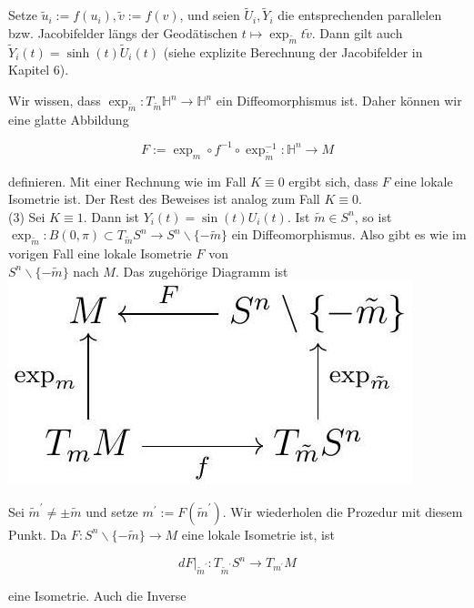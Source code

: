 \documentclass[10pt, letterpaper]{article}
\begin{document}
Setze $\tilde{u}_{i}:=f\left(u_{i}\right), \tilde{v}:=f(v)$, und seien $\tilde{U}_{i}, \tilde{Y}_{i}$ die entsprechenden parallelen bzw. Jacobifelder längs der Geodätischen $t \mapsto \exp _{\tilde{m}} t \tilde{v}$. Dann gilt auch $\tilde{Y}_{i}(t)=\sinh (t) \tilde{U}_{i}(t)$ (siehe explizite Berechnung der Jacobifelder in Kapitel 6).

Wir wissen, dass $\exp _{\tilde{m}}: T_{\tilde{m}} \mathbb{H}^{n} \rightarrow \mathbb{H}^{n}$ ein Diffeomorphismus ist. Daher können wir eine glatte Abbildung

$$
F:=\exp _{m} \circ f^{-1} \circ \exp _{\tilde{m}}^{-1}: \mathbb{H}^{n} \rightarrow M
$$

definieren. Mit einer Rechnung wie im Fall $K \equiv 0$ ergibt sich, dass $F$ eine lokale Isometrie ist. Der Rest des Beweises ist analog zum Fall $K \equiv 0$.\\
(3) Sei $K \equiv 1$. Dann ist $Y_{i}(t)=\sin (t) U_{i}(t)$. Ist $\tilde{m} \in S^{n}$, so ist $\exp _{\tilde{m}}: B(0, \pi) \subset T_{\tilde{m}} S^{n} \rightarrow S^{n} \backslash\{-\tilde{m}\}$ ein Diffeomorphismus. Also gibt es wie im vorigen Fall eine lokale Isometrie $F$ von\\
$S^{n} \backslash\{-\tilde{m}\}$ nach $M$. Das zugehörige Diagramm ist\\
\includegraphics[max width=\textwidth, center]{2025_05_20_3825c151ba0898b77b6eg-086}

Sei $\tilde{m}^{\prime} \neq \pm \tilde{m}$ und setze $m^{\prime}:=F\left(\tilde{m}^{\prime}\right)$. Wir wiederholen die Prozedur mit diesem Punkt. Da $F: S^{n} \backslash\{-\tilde{m}\} \rightarrow M$ eine lokale Isometrie ist, ist

$$
\left.d F\right|_{\tilde{m}^{\prime}}: T_{\tilde{m}^{\prime}} S^{n} \rightarrow T_{m^{\prime}} M
$$

eine Isometrie. Auch die Inverse
\end{document}

